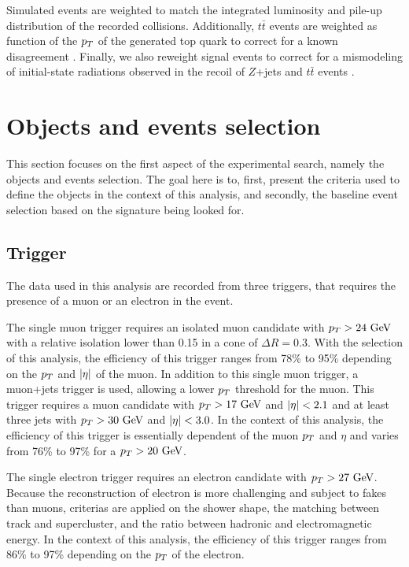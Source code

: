     Simulated events are weighted to match the integrated luminosity and pile-up distribution
    of the recorded collisions. Additionally, $t\bar{t}$ events are weighted as function of
    the $p_T$ of the generated top quark to correct for a known disagreement \cite{topPtReweighting}.
    Finally, we also reweight signal events to correct for a mismodeling of initial-state
    radiations observed in the recoil of $Z$+jets and $t\bar{t}$ events \cite{ISRmodelingDominick}.

    \section{Objects and events selection \label{sec:analysis_objectAndEventSelection}}

    This section focuses on the first aspect of the experimental search, namely the objects
    and events selection. The goal here is to, first, present the criteria used to define the
    objects in the context of this analysis, and secondly, the baseline event selection based
    on the signature being looked for.

        \subsection{Trigger}

    The data used in this analysis are recorded from three triggers, that requires the
    presence of a muon or an electron in the event.

    The single muon trigger requires an isolated muon candidate with $p_T > 24~\text{GeV}$
    with a relative isolation lower than 0.15 in a cone of $\Delta R = 0.3$. With the selection
    of this analysis, the efficiency of this trigger ranges from 78\% to 95\% depending
    on the $p_T$ and $\left| \eta \right|$ of the muon. In addition to this single muon trigger, a
    muon+jets trigger is used, allowing a lower $p_T$ threshold for the muon. This trigger
    requires a muon candidate with $p_T > 17~\text{GeV}$ and $\left| \eta \right| < 2.1$ and at least three
    jets with $p_T > 30~\text{GeV}$ and $\left| \eta \right| < 3.0$. In the context of this analysis, the
    efficiency of this trigger is essentially dependent of the muon $p_T$ and $\eta$ and
    varies from 76\% to 97\% for a $p_T > 20~\text{GeV}$.

    The single electron trigger requires an electron candidate with $p_T > 27~\text{GeV}$. Because
    the reconstruction of electron is more challenging and subject to fakes than muons,
    criterias are applied on the shower shape, the matching between track and supercluster,
    and the ratio between hadronic and electromagnetic energy. In the context of this analysis,
    the efficiency of this trigger ranges from 86\% to 97\% depending on the $p_T$ of the
    electron.

